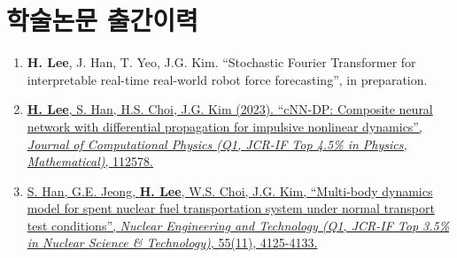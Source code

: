 \documentclass[a4paper,10pt]{extarticle}
\begin{document}
\section*{학술논문 출간이력}
\noindent
\begin{enumerate}[leftmargin=.5cm]
    \item \textbf{H. Lee}, J. Han, T. Yeo, J.G. Kim. “Stochastic Fourier Transformer for interpretable real-time real-world robot force forecasting”, in preparation.
    \item \href{https://www.sciencedirect.com/science/article/pii/S0021999123006733?casa_token=ARUkhI8XI8YAAAAA:wTzCIauJvSlonWw-J-SlAFqPX6NZRQS-qBX59l4YN5O3caEppoglU0duVmMkZYf4nWYd7tm_D_E}{\textbf{H. Lee}, S. Han, H.S. Choi, J.G. Kim (2023). “cNN-DP: Composite neural network with differential propagation for impulsive nonlinear dynamics”, \textit{Journal of Computational Physics (Q1, JCR-IF Top 4.5\% in Physics, Mathematical)}, 112578.}
    \item \href{https://www.google.com/url?sa=t&rct=j&q=&esrc=s&source=web&cd=&cad=rja&uact=8&ved=2ahUKEwij36zWpNKCAxXMMEQIHSBfBMUQFnoECBEQAQ&url=https%3A%2F%2Fwww.sciencedirect.com%2Fscience%2Farticle%2Fpii%2FS1738573323003492&usg=AOvVaw1zj_G3k5c77uhMNnmu0EEC&opi=89978449}{S. Han, G.E. Jeong, \textbf{H. Lee}, W.S. Choi, J.G. Kim, “Multi-body dynamics model for spent nuclear fuel transportation system under normal transport test conditions”, \textit{Nuclear Engineering and Technology (Q1, JCR-IF Top 3.5\% in Nuclear Science \& Technology)}, 55(11), 4125-4133.}
\end{enumerate}

\end{document}
